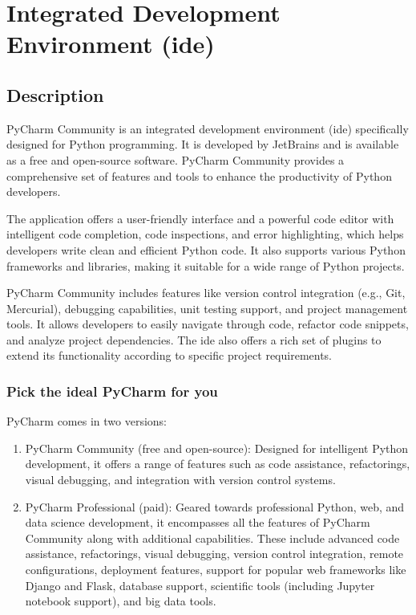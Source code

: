 %
%


\chapter{Integrated Development Environment (\ac{ide})}


\section{Description}

PyCharm Community is an integrated development environment (\ac{ide}) specifically designed for Python programming. It is developed by JetBrains and is available as a free and open-source software. PyCharm Community provides a comprehensive set of features and tools to enhance the productivity of Python developers.

The application offers a user-friendly interface and a powerful code editor with intelligent code completion, code inspections, and error highlighting, which helps developers write clean and efficient Python code. It also supports various Python frameworks and libraries, making it suitable for a wide range of Python projects.

PyCharm Community includes features like version control integration (e.g., Git, Mercurial), debugging capabilities, unit testing support, and project management tools. It allows developers to easily navigate through code, refactor code snippets, and analyze project dependencies. The \ac{ide} also offers a rich set of plugins to extend its functionality according to specific project requirements.

\subsection{Pick the ideal PyCharm for you}

PyCharm comes in two versions:

\begin{enumerate}
	\item PyCharm Community (free and open-source): Designed for intelligent Python development, it offers a range of features such as code assistance, refactorings, visual debugging, and integration with version control systems.
	\item PyCharm Professional (paid): Geared towards professional Python, web, and data science development, it encompasses all the features of PyCharm Community along with additional capabilities. These include advanced code assistance, refactorings, visual debugging, version control integration, remote configurations, deployment features, support for popular web frameworks like Django and Flask, database support, scientific tools (including Jupyter notebook support), and big data tools.
\end{enumerate}


